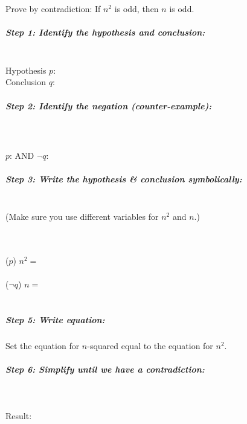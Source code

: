 \documentclass[a4paper,12pt]{book}
\newcounter{question}
\begin{document}
        \newpage
        \begin{questionNOGRADE}{\thequestion}

            Prove by contradiction: If $n^{2}$ is odd, then $n$ is odd.

            \subparagraph{Step 1: Identify the hypothesis and conclusion:}
                ~\\ \tab Hypothesis $p$:    
                ~\\ \tab Conclusion $q$:    
            
            \subparagraph{Step 2: Identify the negation (counter-example):} ~\\~\\
            	\tab[0.5cm]
                $p$:
                 AND \tab[0.5cm]
                $\neg q$:
            
                
            \subparagraph{Step 3: Write the hypothesis \& conclusion symbolically:}
            ~\\
            (Make sure you use different variables for $n^{2}$ and $n$.)
                
                ~\\~\\ \tab ($p$) \tab $n^{2} = $ 
                ~\\~\\ \tab ($\neg q$) \tab $n = $ 
                ~\\~\\ 

            \subparagraph{Step 5: Write equation:}
            
            Set the equation for $n$-squared equal to the equation for $n^2$.
            

            \subparagraph{Step 6: Simplify until we have a contradiction:} ~\\

            Result:
            
        \end{questionNOGRADE}
\end{document}
